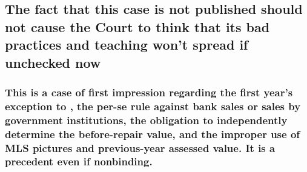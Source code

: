 \documentclass[12pt,\documentclassflag]{michiganCourtOfAppealsBrief}
\begin{document}












\subsection{The fact that this case is not published should not cause the Court to think that its bad practices and teaching won't spread if unchecked now}

\subsubsection{This is a case of first impression regarding the first year's exception to \mathieuGast, the per-se rule against bank sales or sales by government institutions, the obligation to independently determine the before-repair value, and the improper use of MLS pictures and previous-year assessed value. It is a precedent even if nonbinding.}
\end{document}
